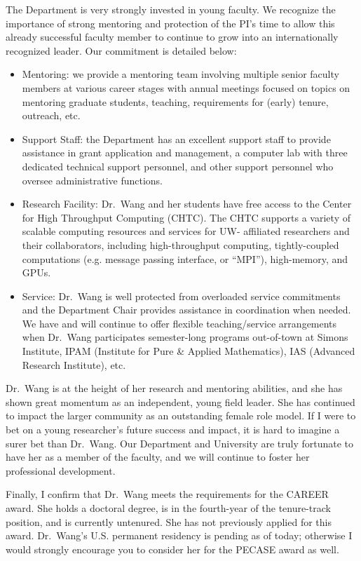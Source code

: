 \documentclass{article}
\begin{document}
The Department is very strongly invested in young faculty. We recognize the importance of strong mentoring and protection of the PI’s time to allow this already successful faculty member to continue to grow into an internationally recognized leader. Our commitment is detailed below:
\begin{itemize}[wide,labelwidth=!, labelindent=0pt,itemsep=0.1ex,parsep=0ex,topsep=0pt]
\item Mentoring: we provide a mentoring team involving multiple senior faculty members at various career stages with annual meetings focused on topics on mentoring graduate students, teaching, requirements for (early) tenure, outreach, etc. 
\item Support Staff: the Department has an excellent support staff to provide assistance in grant application and management, a computer lab with three dedicated technical support personnel, and other support personnel who oversee administrative functions. 
\item Research Facility: Dr.\ Wang and her students have free access to the Center for High Throughput Computing (CHTC). The CHTC supports a variety of scalable computing resources and services for UW- affiliated researchers and their collaborators, including high-throughput computing, tightly-coupled computations (e.g. message passing interface, or “MPI”), high-memory, and GPUs.
\item Service: Dr.\ Wang is well protected from overloaded service commitments and the Department Chair provides assistance in coordination when needed. We have and will continue to offer flexible teaching/service arrangements when Dr.\ Wang participates semester-long programs out-of-town at Simons Institute, IPAM (Institute for Pure \& Applied Mathematics), IAS (Advanced Research Institute), etc. 
\end{itemize}

Dr.\ Wang is at the height of her research and mentoring abilities, and she has shown great momentum as an independent, young field leader. She has continued to impact the larger community as an outstanding female role model. If I were to bet on a young researcher’s future success and impact, it is hard to imagine a surer bet than Dr.\ Wang. Our Department and University are truly fortunate to have her as a member of the faculty, and we will continue to foster her professional development.

Finally, I confirm that Dr.\ Wang meets the requirements for the CAREER award. She holds a doctoral degree, is in the fourth-year of the tenure-track position, and is currently untenured. She has not previously applied for this award. Dr.\ Wang's U.S. permanent residency is pending as of today; otherwise I would strongly encourage you to consider her for the PECASE award as well.
\end{document}
